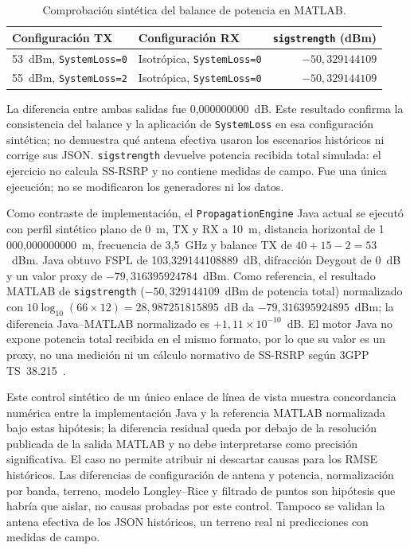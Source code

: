 \begin{table}[H]
\centering
\caption{Comprobación sintética del balance de potencia en MATLAB.}
\label{tab:matlab_balance_sintetico}
\small
\begin{tabularx}{\textwidth}{|X|X|r|}
\hline
\textbf{Configuración TX} & \textbf{Configuración RX} & \textbf{\texttt{sigstrength} (dBm)} \\
\hline
53~dBm, \texttt{SystemLoss=0} & Isotrópica, \texttt{SystemLoss=0} & $-50{,}329144109$ \\
55~dBm, \texttt{SystemLoss=2} & Isotrópica, \texttt{SystemLoss=0} & $-50{,}329144109$ \\
\hline
\end{tabularx}
\end{table}

La diferencia entre ambas salidas fue 0,000000000~dB. Este resultado confirma la
consistencia del balance y la aplicación de \texttt{SystemLoss} en esa configuración
sintética; no demuestra qué antena efectiva usaron los escenarios históricos ni corrige
sus JSON. \texttt{sigstrength} devuelve potencia recibida total simulada: el ejercicio no
calcula SS-RSRP y no contiene medidas de campo. Fue una única ejecución; no se modificaron
los generadores ni los datos.

Como contraste de implementación, el \texttt{PropagationEngine} Java actual se ejecutó
con perfil sintético plano de 0~m, TX y RX a 10~m, distancia horizontal de
1\,000{,}000000000~m, frecuencia de 3,5~GHz y balance TX de
$40+15-2=53$~dBm. Java obtuvo FSPL de 103,329144108889~dB, difracción Deygout de 0~dB y
un valor proxy de $-79{,}316395924784$~dBm. Como referencia, el resultado MATLAB de
\texttt{sigstrength} ($-50{,}329144109$~dBm de potencia total) normalizado con
$10\log_{10}(66\times12)=28{,}987251815895$~dB da
$-79{,}316395924895$~dBm; la diferencia Java--MATLAB normalizado es
$+1{,}11\times10^{-10}$~dB. El motor Java no expone potencia total recibida en el mismo
formato, por lo que su valor es un proxy, no una medición ni un cálculo normativo de
SS-RSRP según 3GPP TS~38.215~\cite{3gpp_ts38215_2022}.

Este control sintético de un único enlace de línea de vista muestra concordancia numérica
entre la implementación Java y la referencia MATLAB normalizada bajo estas hipótesis; la
diferencia residual queda por debajo de la resolución publicada de la salida MATLAB y no
debe interpretarse como precisión significativa. El caso no permite atribuir ni descartar
causas para los RMSE históricos. Las diferencias de configuración de antena y potencia,
normalización por banda, terreno, modelo Longley--Rice y filtrado de puntos son hipótesis
que habría que aislar, no causas probadas por este control. Tampoco se validan la antena
efectiva de los JSON históricos, un terreno real ni predicciones con medidas de campo.

